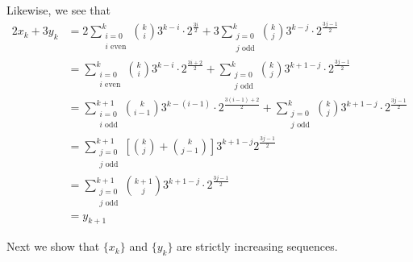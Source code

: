 \documentclass[12 pt]{amsart}
\begin{document}
  Likewise, we see that
  \begin{align*}
    2x_k + 3y_k
    &=
      2
      \sum_{\substack{i = 0 \\ \text{$i$ even}}}^k
        \binom{k}{i}
        3^{k-i}
        \cdot
        2^{\frac{3i}{2}}
      +
      3
      \sum_{\substack{j = 0 \\ \text{$j$ odd}}}^k
        \binom{k}{j}
        3^{k-j}
        \cdot
        2^{\frac{3j-1}{2}} \\
    &=
      \sum_{\substack{i = 0 \\ \text{$i$ even}}}^k
        \binom{k}{i}
        3^{k-i}
        \cdot
        2^{\frac{3i+2}{2}}
      +
      \sum_{\substack{j = 0 \\ \text{$j$ odd}}}^k
        \binom{k}{j}
        3^{k+1-j}
        \cdot
        2^{\frac{3j-1}{2}} \\
    &=
        \sum_{\substack{i = 0 \\ \text{$i$ odd}}}^{k+1}
        \binom{k}{i-1}
        3^{k-(i-1)}
        \cdot
        2^{\frac{3(i-1)+2}{2}}
      +
      \sum_{\substack{j = 0 \\ \text{$j$ odd}}}^k
        \binom{k}{j}
        3^{k+1-j}
        \cdot
        2^{\frac{3j-1}{2}} \\
    &=
      \sum_{\substack{j = 0 \\ \text{$j$ odd}}}^{k+1}
      \left[
        \binom{k}{j}
        + 
        \binom{k}{j-1}
      \right]
      3^{k+1-j}
      2^{\frac{3j-1}{2}} \\
    &=
      \sum_{\substack{j = 0 \\ \text{$j$ odd}}}^{k+1}
      \binom{k+1}{j}
      3^{k+1-j}
      \cdot
      2^{\frac{3j-1}{2}} \\
    &=
      y_{k+1}
  \end{align*}

  Next we show that $\{x_k\}$ and $\{y_k\}$ are
  strictly increasing
  sequences.
\end{document}
